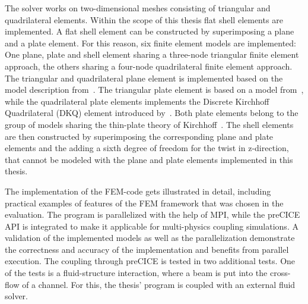 The solver works on two-dimensional meshes consisting of triangular and quadrilateral elements. Within the scope of this thesis flat shell elements are implemented. A flat shell element can be constructed by superimposing a plane and a plate element. For this reason, six finite element models are implemented: One plane, plate and shell element sharing a three-node triangular finite element approach, the others sharing a four-node quadrilateral finite element approach. The triangular and quadrilateral plane element is implemented based on the model description from~\cite{steinke2005finite}. The triangular plate element is based on a model from~\cite{specht1988modified}, while the quadrilateral plate elements implements the Discrete Kirchhoff Quadrilateral (DKQ) element introduced by~\cite{zienkiewicz2000finite}. Both plate elements belong to the group of models sharing the thin-plate theory of Kirchhoff~\cite{steinke2005finite}. The shell elements are then constructed by superimposing the corresponding plane and plate elements and the adding a sixth degree of freedom for the twist in z-direction, that cannot be modeled with the plane and plate elements implemented in this thesis.

The implementation of the FEM-code gets illustrated in detail, including practical examples of features of the FEM framework that was chosen in the evaluation. The program is parallelized with the help of MPI, while the preCICE API is integrated to make it applicable for multi-physics coupling simulations. A validation of the implemented models as well as the parallelization demonstrate the correctness and accuracy of the implementation and benefits from parallel execution. The coupling through preCICE is tested in two additional tests. One of the tests is a fluid-structure interaction, where a beam is put into the cross-flow of a channel. For this, the thesis' program is coupled with an external fluid solver.

